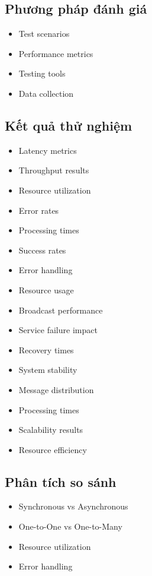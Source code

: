 \subsection{Phương pháp đánh giá}
\begin{itemize}
    \item Test scenarios
    \item Performance metrics
    \item Testing tools
    \item Data collection
\end{itemize}

\subsection{Kết quả thử nghiệm}
\begin{itemize}
    \item Latency metrics
    \item Throughput results
    \item Resource utilization
    \item Error rates
\end{itemize}

\begin{itemize}
    \item Processing times
    \item Success rates
    \item Error handling
    \item Resource usage
\end{itemize}

\begin{itemize}
    \item Broadcast performance
    \item Service failure impact
    \item Recovery times
    \item System stability
\end{itemize}

\begin{itemize}
    \item Message distribution
    \item Processing times
    \item Scalability results
    \item Resource efficiency
\end{itemize}

\subsection{Phân tích so sánh}
\begin{itemize}
    \item Synchronous vs Asynchronous
    \item One-to-One vs One-to-Many
    \item Resource utilization
    \item Error handling
\end{itemize} 